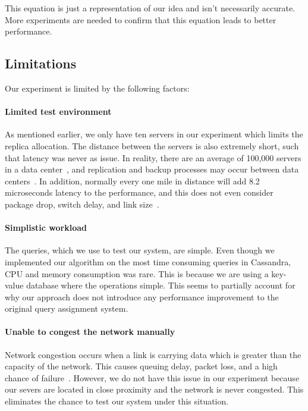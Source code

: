This equation is just a representation of our idea and isn't necessarily accurate. More experiments are needed to confirm that this equation leads to better performance. 

\subsection{Limitations}
Our experiment is limited by the following factors:

\paragraph{Limited test environment}
As mentioned earlier, we only have ten servers in our experiment which limits the replica allocation. The distance between the servers is also extremely short, such that latency was never as issue. In reality, there are an average of 100,000 servers in a data center~\cite{Guo:2010:SDC:1921168.1921188}, and replication and backup processes may occur between data centers~\cite{F5-Accelerate}. In addition, normally every one mile in distance will add 8.2 microseconds latency to the performance, and this does not even consider package drop, switch delay, and link size~\cite{Cisco-Latency}.
 
\paragraph{Simplistic workload}
The queries, which we use to test our system, are simple. Even though we implemented our algorithm on the most time consuming queries in Cassandra, CPU and memory consumption was rare. This is because we are using a key-value database where the operations simple. This seems to partially account for why our approach does not introduce any performance improvement to the original query assignment system.
 
\paragraph{Unable to congest the network manually}
Network congestion occurs when a link is carrying data which is greater than the capacity of the network. This causes queuing delay, packet loss, and a high chance of failure~\cite{103559}. However, we do not have this issue in our experiment because our severs are located in close proximity and the network is never congested. This eliminates the chance to test our system under this situation.

